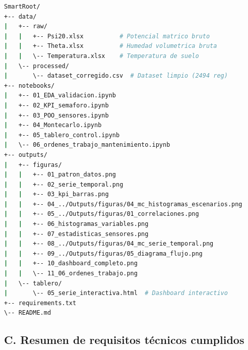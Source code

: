\documentclass[12pt,a4paper]{article}
\begin{document}
\begin{lstlisting}[language=bash, caption={Estructura de directorios del proyecto SmartRoot.}]
SmartRoot/
+-- data/
|   +-- raw/
|   |   +-- Psi20.xlsx          # Potencial matrico bruto
|   |   +-- Theta.xlsx          # Humedad volumetrica bruta
|   |   \-- Temperatura.xlsx    # Temperatura de suelo
|   \-- processed/
|       \-- dataset_corregido.csv  # Dataset limpio (2494 reg)
+-- notebooks/
|   +-- 01_EDA_validacion.ipynb
|   +-- 02_KPI_semaforo.ipynb
|   +-- 03_POO_sensores.ipynb
|   +-- 04_Montecarlo.ipynb
|   +-- 05_tablero_control.ipynb
|   \-- 06_ordenes_trabajo_mantenimiento.ipynb
+-- outputs/
|   +-- figuras/
|   |   +-- 01_patron_datos.png
|   |   +-- 02_serie_temporal.png
|   |   +-- 03_kpi_barras.png
|   |   +-- 04_../Outputs/figuras/04_mc_histogramas_escenarios.png
|   |   +-- 05_../Outputs/figuras/01_correlaciones.png
|   |   +-- 06_histogramas_variables.png
|   |   +-- 07_estadisticas_sensores.png
|   |   +-- 08_../Outputs/figuras/04_mc_serie_temporal.png
|   |   +-- 09_../Outputs/figuras/05_diagrama_flujo.png
|   |   +-- 10_dashboard_completo.png
|   |   \-- 11_06_ordenes_trabajo.png
|   \-- tablero/
|       \-- 05_serie_interactiva.html  # Dashboard interactivo
+-- requirements.txt
\-- README.md
\end{lstlisting}

\subsection*{C. Resumen de requisitos técnicos cumplidos}
\end{document}
